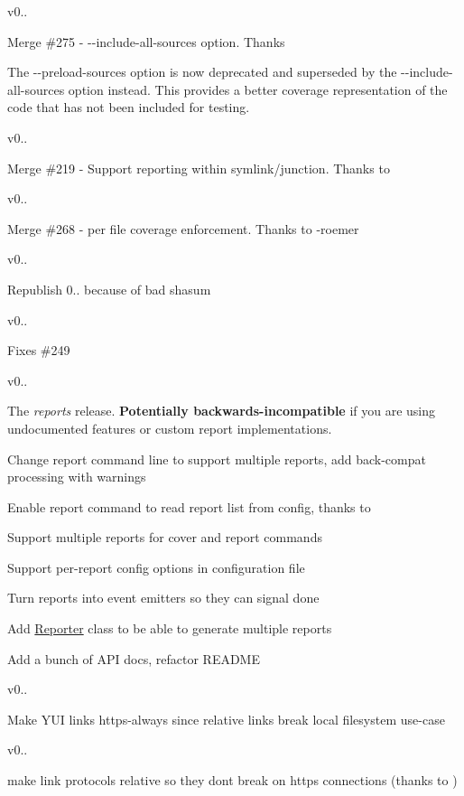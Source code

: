 v0.. 

Merge \#275 -\/ {\ttfamily -\/-\/include-\/all-\/sources} option. Thanks 

The {\ttfamily -\/-\/preload-\/sources} option is now deprecated and superseded by the {\ttfamily -\/-\/include-\/all-\/sources} option instead. This provides a better coverage representation of the code that has not been included for testing. 

v0.. 

Merge \#219 -\/ Support reporting within symlink/junction. Thanks to   

v0.. 

Merge \#268 -\/ per file coverage enforcement. Thanks to -\/roemer  

v0.. 

Republish 0.. because of bad shasum  

v0.. 

Fixes \#249  

v0.. 

The {\itshape reports} release. {\bfseries Potentially backwards-\/incompatible} if you are using undocumented features or custom report implementations. 
\begin{DoxyItemize}
\item Change report command line to support multiple reports, add back-\/compat processing with warnings 
\item Enable {\ttfamily report} command to read report list from config, thanks to  
\item Support multiple reports for {\ttfamily cover} and {\ttfamily report} commands 
\item Support per-\/report config options in configuration file 
\item Turn reports into event emitters so they can signal {\ttfamily done} 
\item Add {\ttfamily \hyperlink{class_reporter}{Reporter}} class to be able to generate multiple reports 
\item Add a bunch of A\+P\+I docs, refactor R\+E\+A\+D\+M\+E 
\end{DoxyItemize}

v0..

Make Y\+U\+I links https-\/always since relative links break local filesystem use-\/case   

v0..

make link protocols relative so they don\textquotesingle{}t break on https connections (thanks to )   

